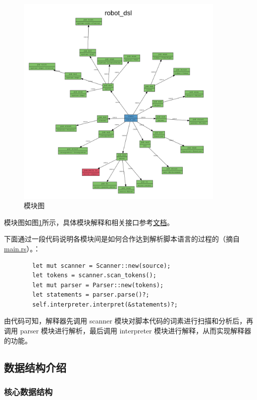\documentclass[12pt]{article}
\begin{document}
    \begin{figure}[h]
        \centering
        \includegraphics[width=0.9\textwidth]{mod-graph.png}
        \caption{模块图}
        \label{fig:mod-graph}
    \end{figure}

    模块图如图\ref{fig:mod-graph}所示，具体模块解释和相关接口参考\href{generate_by_cargo/robot_dsl/index.html}{文档}。

    下面通过一段代码说明各模块间是如何合作达到解析脚本语言的过程的（摘自\href{../src/main.rs}{main.rs}）。：

    \begin{verbatim}
        let mut scanner = Scanner::new(source);
        let tokens = scanner.scan_tokens();
        let mut parser = Parser::new(tokens);
        let statements = parser.parse()?;
        self.interpreter.interpret(&statements)?;
    \end{verbatim}

    由代码可知，解释器先调用 scanner 模块对脚本代码的词素进行扫描和分析后，再 调用 parser 模块进行解析，最后调用 interpreter 模块进行解释，从而实现解释器的功能。

    \subsection{数据结构介绍}

    \subsubsection{核心数据结构}
\end{document}
